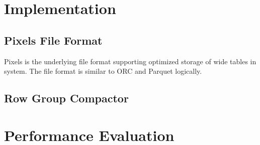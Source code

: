 \section{Implementation}
\label{sec:impl}
\subsection{Pixels File Format}
Pixels is the underlying file format supporting optimized storage of wide tables in system.
The file format is similar to ORC and Parquet logically.

\subsection{Row Group Compactor}


\section{Performance Evaluation}
\label{sec:exp}